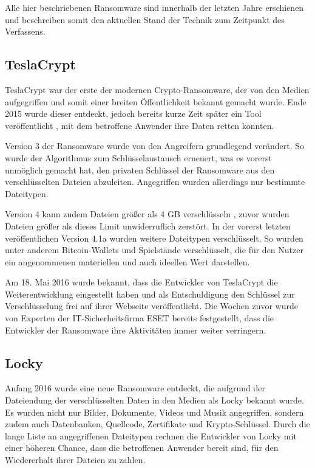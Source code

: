 Alle hier beschriebenen Ransomware sind innerhalb der letzten Jahre erschienen und beschreiben somit den aktuellen Stand der Technik zum Zeitpunkt des Verfassens.

\subsection{TeslaCrypt}
TeslaCrypt war der erste der modernen Crypto-Ransomware, der von den Medien aufgegriffen und somit einer breiten Öffentlichkeit bekannt gemacht wurde. Ende 2015 \cite{tesla:entdeckt} wurde dieser entdeckt, jedoch bereits kurze Zeit später ein Tool veröffentlicht \cite{tesla:geknackt}, mit dem betroffene Anwender ihre Daten retten konnten.

Version 3 der Ransomware wurde von den Angreifern grundlegend verändert. So wurde der Algorithmus zum Schlüsselaustausch erneuert, was es vorerst unmöglich gemacht hat, den privaten Schlüssel der Ransomware aus den verschlüsselten Dateien abzuleiten. Angegriffen wurden allerdings nur bestimmte Dateitypen. \cite{tesla:version3} \cite{tesla:version3_2}

Version 4 kann zudem Dateien größer als 4 GB verschlüsseln \cite{tesla:version4}, zuvor wurden Dateien größer als dieses Limit unwiderruflich zerstört. In der vorerst letzten veröffentlichen Version 4.1a \cite{tesla:version41} wurden weitere Dateitypen verschlüsselt. So wurden unter anderem Bitcoin-Wallets und Spielstände verschlüsselt, die für den Nutzer ein angenommenen materiellen und auch ideellen Wert darstellen.

Am 18. Mai 2016 wurde bekannt, dass die Entwickler von TeslaCrypt die Weiterentwicklung eingestellt haben und als Entschuldigung den Schlüssel zur Verschlüsselung frei auf ihrer Webseite veröffentlicht. Die Wochen zuvor wurde von Experten der IT-Sicherheitsfirma ESET bereits festgestellt, dass die Entwickler der Ransomware ihre Aktivitäten immer weiter verringern. \cite{tesla:end}

\subsection{Locky}
Anfang 2016 wurde eine neue Ransomware entdeckt, die aufgrund der Dateiendung der verschlüsselten Daten in den Medien als \glqq Locky\grqq{} bekannt wurde. Es wurden nicht nur Bilder, Dokumente, Videos und Musik angegriffen, sondern zudem auch Datenbanken, Quellcode, Zertifikate und Krypto-Schlüssel. Durch die lange Liste an angegriffenen Dateitypen rechnen die Entwickler von Locky mit einer höheren Chance, dass die betroffenen Anwender bereit sind, für den Wiedererhalt ihrer Dateien zu zahlen.

